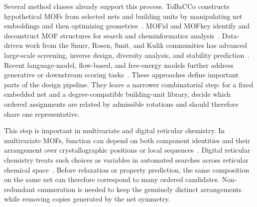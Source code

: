\documentclass[pdflatex,sn-mathphys-num]{sn-jnl}
\theoremstyle{thmstyleone}%
\begin{document}
Several method classes already support this process. ToBaCCo constructs hypothetical MOFs from selected nets and building units by manipulating net embeddings and then optimizing geometries~\cite{colon2017topologically}. MOFid and MOFkey identify and deconstruct MOF structures for search and cheminformatics analysis~\cite{bucior2019identification}. Data-driven work from the Snurr, Rosen, Smit, and Kulik communities has advanced large-scale screening, inverse design, diversity analysis, and stability prediction~\cite{colon2014high,bucior2019identification,yao2021inverse,moosavi2020diversity,nandy2021stable}. Recent language-model, flow-based, and free-energy models further address generative or downstream scoring tasks~\cite{niyongabo2025freeenergy,badrinarayanan2025mofgpt,Kim2024MOFFlowFM}. These approaches define important parts of the design pipeline. They leave a narrower combinatorial step: for a fixed embedded net and a degree-compatible building-unit library, decide which ordered assignments are related by admissible rotations and should therefore share one representative.

This step is important in multivariate and digital reticular chemistry. In multivariate MOFs, function can depend on both component identities and their arrangement over crystallographic positions or local sequences~\cite{zhang2015multivariate,helal2017multivariate,ji2020sequencing,canossa2023sequences}. Digital reticular chemistry treats such choices as variables in automated searches across reticular chemical space~\cite{lyu2020digital}. Before relaxation or property prediction, the same composition on the same net can therefore correspond to many ordered candidates. Non-redundant enumeration is needed to keep the genuinely distinct arrangements while removing copies generated by the net symmetry.
\end{document}
